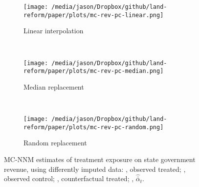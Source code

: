 \begin{figure*}[htbp]
	\centering
	\begin{subfigure}[t]{0.43\textwidth}
		\centering
		\texttt{[image: /media/jason/Dropbox/github/land-reform/paper/plots/mc-rev-pc-linear.png]}
		\caption{Linear interpolation} 
	\end{subfigure}
	~ 
	\begin{subfigure}[t]{0.43\textwidth}
		\centering
		\texttt{[image: /media/jason/Dropbox/github/land-reform/paper/plots/mc-rev-pc-median.png]}
		\caption{Median replacement}
	\end{subfigure}
	~ 
	\begin{subfigure}[t]{0.43\textwidth}
		\centering
		\texttt{[image: /media/jason/Dropbox/github/land-reform/paper/plots/mc-rev-pc-random.png]}
		\caption{Random replacement}
	\end{subfigure}
	\caption{MC-NNM estimates of treatment exposure on state government revenue, using differently imputed data:				
		{\color{Darjeeling15}{\sampleline{}}}, observed treated;
		{}, observed control;
		{}, counterfactual treated;
		{}, $\hat{\bar{\alpha}}_{t}$.\label{mc-estimates-rev-pc-imp}} 
\end{figure*}